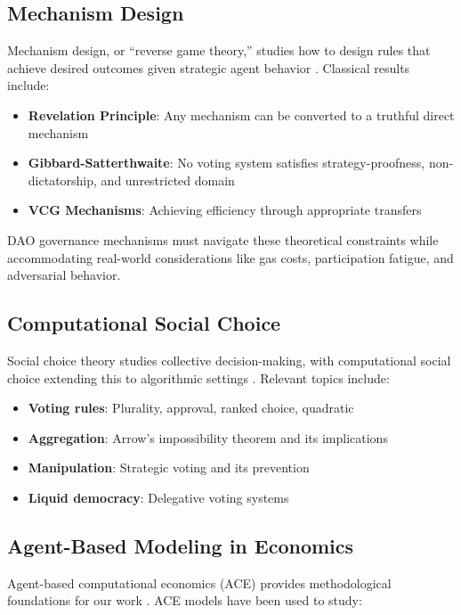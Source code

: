 \subsection{Mechanism Design}

Mechanism design, or ``reverse game theory,'' studies how to design rules that achieve desired outcomes given strategic agent behavior \citep{nisan2007algorithmic}. Classical results include:

\begin{itemize}
    \item \textbf{Revelation Principle}: Any mechanism can be converted to a truthful direct mechanism
    \item \textbf{Gibbard-Satterthwaite}: No voting system satisfies strategy-proofness, non-dictatorship, and unrestricted domain
    \item \textbf{VCG Mechanisms}: Achieving efficiency through appropriate transfers
\end{itemize}

DAO governance mechanisms must navigate these theoretical constraints while accommodating real-world considerations like gas costs, participation fatigue, and adversarial behavior.

\subsection{Computational Social Choice}

Social choice theory studies collective decision-making, with computational social choice extending this to algorithmic settings \citep{brandt2016handbook}. Relevant topics include:

\begin{itemize}
    \item \textbf{Voting rules}: Plurality, approval, ranked choice, quadratic
    \item \textbf{Aggregation}: Arrow's impossibility theorem and its implications
    \item \textbf{Manipulation}: Strategic voting and its prevention
    \item \textbf{Liquid democracy}: Delegative voting systems
\end{itemize}

\subsection{Agent-Based Modeling in Economics}

Agent-based computational economics (ACE) provides methodological foundations for our work \citep{tesfatsion2006handbook}. ACE models have been used to study:

